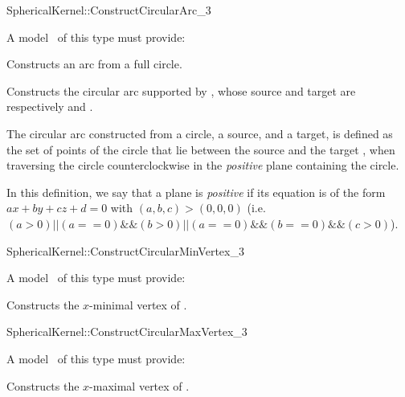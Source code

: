 \begin{ccRefFunctionObjectConcept}{SphericalKernel::ConstructCircularArc_3}

A model \ccVar\ of this type must provide:

{Constructs an arc from a full circle.}

{Constructs the circular arc supported by , whose source and target 
are respectively  and .
}

The circular arc constructed from a circle, a source, and a target, is
defined as the set of points of the circle that lie between the source
 and the target , when traversing the circle
counterclockwise in the \textit{positive} plane containing the circle.

In this definition, we say that a plane is \textit{positive} if its
equation is of the form $ax+by+cz+d=0$ with $(a,b,c)>(0,0,0)$
(i.e. $(a>0) || (a==0) \&\& (b>0) || (a==0)\&\&(b==0)\&\&(c>0)$).

\end{ccRefFunctionObjectConcept}
\begin{ccRefFunctionObjectConcept}{SphericalKernel::ConstructCircularMinVertex_3} 


A model \ccVar\ of this type must provide:


{Constructs the $x$-minimal vertex of .}

\end{ccRefFunctionObjectConcept}
\begin{ccRefFunctionObjectConcept}{SphericalKernel::ConstructCircularMaxVertex_3} 


A model \ccVar\ of this type must provide:


{Constructs the $x$-maximal vertex of .}

\end{ccRefFunctionObjectConcept}
